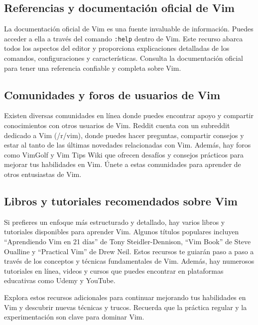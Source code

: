 \documentclass[
  a4paper,
]{article}
\begin{document}
\subsection{Referencias y documentación oficial de
Vim}\label{referencias-y-documentaciuxf3n-oficial-de-vim}

La documentación oficial de Vim es una fuente invaluable de información.
Puedes acceder a ella a través del comando \texttt{:help} dentro de Vim.
Este recurso abarca todos los aspectos del editor y proporciona
explicaciones detalladas de los comandos, configuraciones y
características. Consulta la documentación oficial para tener una
referencia confiable y completa sobre Vim.

\subsection{Comunidades y foros de usuarios de
Vim}\label{comunidades-y-foros-de-usuarios-de-vim}

Existen diversas comunidades en línea donde puedes encontrar apoyo y
compartir conocimientos con otros usuarios de Vim. Reddit cuenta con un
subreddit dedicado a Vim (/r/vim), donde puedes hacer preguntas,
compartir consejos y estar al tanto de las últimas novedades
relacionadas con Vim. Además, hay foros como VimGolf y Vim Tips Wiki que
ofrecen desafíos y consejos prácticos para mejorar tus habilidades en
Vim. Únete a estas comunidades para aprender de otros entusiastas de
Vim.

\subsection{Libros y tutoriales recomendados sobre
Vim}\label{libros-y-tutoriales-recomendados-sobre-vim}

Si prefieres un enfoque más estructurado y detallado, hay varios libros
y tutoriales disponibles para aprender Vim. Algunos títulos populares
incluyen ``Aprendiendo Vim en 21 días'' de Tony Steidler-Dennison, ``Vim
Book'' de Steve Oualline y ``Practical Vim'' de Drew Neil. Estos
recursos te guiarán paso a paso a través de los conceptos y técnicas
fundamentales de Vim. Además, hay numerosos tutoriales en línea, videos
y cursos que puedes encontrar en plataformas educativas como Udemy y
YouTube.

Explora estos recursos adicionales para continuar mejorando tus
habilidades en Vim y descubrir nuevas técnicas y trucos. Recuerda que la
práctica regular y la experimentación son clave para dominar Vim.


\printbibliography
\end{document}
